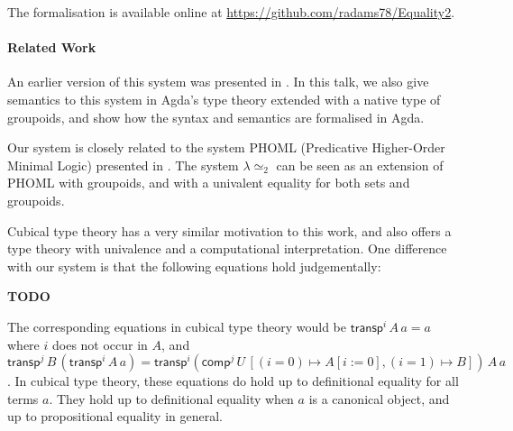 \documentclass{easychair}
\newcommand{\LEtwo}{\ensuremath{\lambda \simeq_2}}
\begin{document}
The formalisation is available online at \url{https://github.com/radams78/Equality2}.

\paragraph{Related Work}

An earlier version of this system was presented in \cite{ap:tsnhu}.  In this talk, we also give semantics to this system in Agda's type theory extended with a native type of groupoids, and show how the syntax and semantics are formalised in Agda.

Our system is closely related to the system PHOML (Predicative Higher-Order Minimal Logic) presented in \cite{abc:ncrpehoml}.  The system $\LEtwo$ can be seen as an extension of PHOML with groupoids, and with a univalent equality for both sets and groupoids.

Cubical type theory \cite{cchm:cubical, huber:canonicity} has a very similar motivation to this work, and also offers a type theory with univalence and a computational interpretation.  One difference with our system is that the following equations hold judgementally:

\textbf{TODO}

The corresponding equations in cubical type theory would be $\mathsf{transp}^i \, A \, a = a$ where $i$ does not occur in $A$, and $\mathsf{transp}^j \, B \, (\mathsf{transp}^i \, A \, a) = \mathsf{transp}^i (\mathsf{comp}^j \, U \, [(i = 0) \mapsto A[i:=0], (i=1) \mapsto B]) \, A \, a$.  In cubical type theory, these equations do hold up to definitional equality for all terms $a$.  They hold up to definitional equality when $a$ is a canonical object, and up to propositional equality in general.


\end{document}

